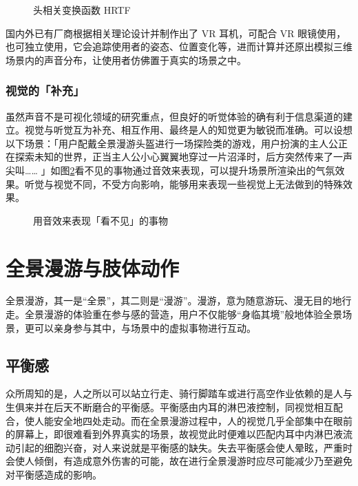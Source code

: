 \begin{figure}[htp]
\centering
{}
\caption{头相关变换函数 HRTF}
\label{fig:hrtf}
\end{figure}

国内外已有厂商根据相关理论设计并制作出了 VR 耳机，可配合 VR 眼镜使用，也可独立使用，它会追踪使用者的姿态、位置变化等，进而计算并还原出模拟三维场景内的声音分布，让使用者仿佛置于真实的场景之中。

\subsubsection{视觉的「补充」}
虽然声音不是可视化领域的研究重点，但良好的听觉体验的确有利于信息渠道的建立。视觉与听觉互为补充、相互作用、最终是人的知觉更为敏锐而准确。可以设想以下场景：「用户配戴全景漫游头盔进行一场探险类的游戏，用户扮演的主人公正在探索未知的世界，正当主人公小心翼翼地穿过一片沼泽时，后方突然传来了一声尖叫…… 」如图\ref{fig:audio-source}看不见的事物通过音效来表现，可以提升场景所渲染出的气氛效果。听觉与视觉不同，不受方向影响，能够用来表现一些视觉上无法做到的特殊效果。

\begin{figure}[htp]
\centering
{}
\caption{用音效来表现「看不见」的事物}
\label{fig:audio-source}
\end{figure}

\section{全景漫游与肢体动作}

全景漫游，其一是“全景”，其二则是“漫游”。漫游，意为随意游玩、漫无目的地行走。全景漫游的体验重在参与感的营造，用户不仅能够“身临其境”般地体验全景场景，更可以亲身参与其中，与场景中的虚拟事物进行互动。

\subsection{平衡感}
众所周知的是，人之所以可以站立行走、骑行脚踏车或进行高空作业依赖的是人与生俱来并在后天不断磨合的平衡感。平衡感由内耳的淋巴液控制，同视觉相互配合，使人能安全地四处走动。而在全景漫游过程中，人的视觉几乎全部集中在眼前的屏幕上，即很难看到外界真实的场景，故视觉此时便难以匹配内耳中内淋巴液流动引起的细胞兴奋，对人来说就是平衡感的缺失。失去平衡感会使人晕眩，严重时会使人倾倒，有造成意外伤害的可能，故在进行全景漫游时应尽可能减少乃至避免对平衡感造成的影响。

